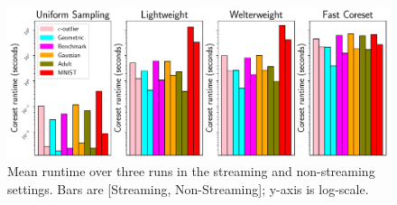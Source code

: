 \begin{figure}
    \centering
    \includegraphics[width=.95\linewidth]{images/2/coreset_runtime-composition.pdf}
    \caption{Mean runtime over three runs in the streaming and non-streaming settings. Bars are [Streaming, Non-Streaming]; y-axis is log-scale.}
    \label{fig:streaming_runtimes}
\end{figure}
